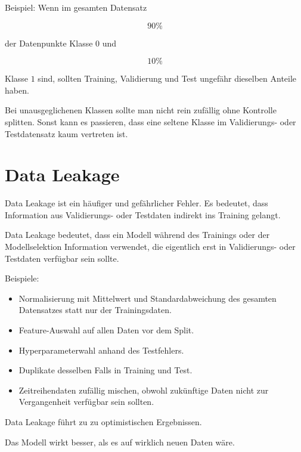 Beispiel:
Wenn im gesamten Datensatz

\[
    90\%
\]

der Datenpunkte Klasse \(0\) und

\[
    10\%
\]

Klasse \(1\) sind, sollten Training, Validierung und Test ungefähr dieselben Anteile haben.

\begin{examtipbox}
Bei unausgeglichenen Klassen sollte man nicht rein zufällig ohne Kontrolle splitten.
Sonst kann es passieren, dass eine seltene Klasse im Validierungs- oder Testdatensatz kaum vertreten ist.
\end{examtipbox}

\section{Data Leakage}

Data Leakage ist ein häufiger und gefährlicher Fehler.
Es bedeutet, dass Information aus Validierungs- oder Testdaten indirekt ins Training gelangt.

\begin{definitionbox}
Data Leakage bedeutet, dass ein Modell während des Trainings oder der Modellselektion Information verwendet, die eigentlich erst in Validierungs- oder Testdaten verfügbar sein sollte.
\end{definitionbox}

Beispiele:

\begin{itemize}
    \item Normalisierung mit Mittelwert und Standardabweichung des gesamten Datensatzes statt nur der Trainingsdaten.
    \item Feature-Auswahl auf allen Daten vor dem Split.
    \item Hyperparameterwahl anhand des Testfehlers.
    \item Duplikate desselben Falls in Training und Test.
    \item Zeitreihendaten zufällig mischen, obwohl zukünftige Daten nicht zur Vergangenheit verfügbar sein sollten.
\end{itemize}

\begin{conceptbox}
Data Leakage führt zu zu optimistischen Ergebnissen.

Das Modell wirkt besser, als es auf wirklich neuen Daten wäre.
\end{conceptbox}

